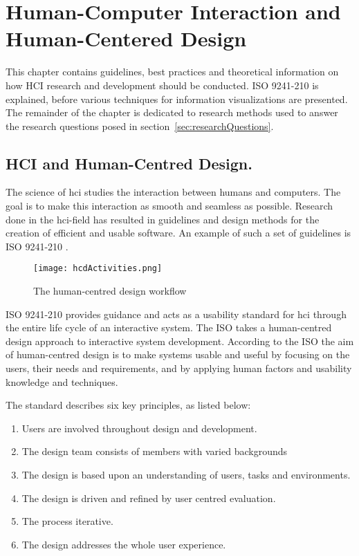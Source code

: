 \chapter{Human-Computer Interaction and Human-Centered Design}
\label{ch:hci}
This chapter contains guidelines, best practices and theoretical information on how HCI research and development should be conducted. ISO 9241-210 is explained, before various techniques for information visualizations are presented. The remainder of the chapter is dedicated to research methods used to answer the research questions posed in section~\ref{sec:researchQuestions}.

\section{HCI and Human-Centred Design.}
The science of \gls{hci} studies the interaction between humans and computers. The goal is to make this interaction as smooth and seamless as possible. Research done in the \gls{hci}-field has resulted in guidelines and design methods for the creation of efficient and usable software. An example of such a set of guidelines is ISO 9241-210 \cite{iso9241}.

\begin{figure}[h!]
	\centering
		\texttt{[image: hcdActivities.png]}
		\caption{\footnotesize The human-centred design workflow}
		\label{fig:hcdActivities}
\end{figure}

ISO 9241-210 provides guidance and acts as a usability standard for \gls{hci} through the entire life cycle of an interactive system. The ISO takes a human-centred design approach to interactive system development. According to the ISO the aim of human-centred design is to make systems usable and useful by focusing on the users, their needs and requirements, and by applying human factors and usability knowledge and techniques.  

The standard describes six key principles, as listed below: 
\begin{enumerate}
  \item Users are involved throughout design and development.
  \item The design team consists of members with varied backgrounds
  \item The design is based upon an understanding of users, tasks and environments.
  \item The design is driven and refined by user centred evaluation.
  \item The process iterative.
  \item The design addresses the whole user experience.
\end{enumerate}

